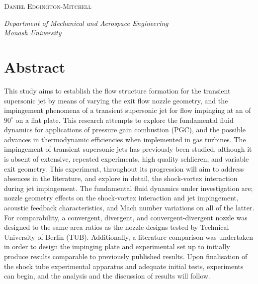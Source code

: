 \begin{titlepage}
	\vspace{0.5\baselineskip} %
	
	{\scshape\Large Daniel Edgington-Mitchell} %
	
	\vspace{2\baselineskip} %
	
	\textit{Department of Mechanical and Aerospace Engineering \\ Monash University} %
	
	\vfill %
	
	


\end{titlepage}
\section*{Abstract}
This study aims to establish the flow structure formation for the transient supersonic jet by means of varying the exit flow nozzle geometry, and the impingement phenomena of a transient supersonic jet for flow impinging at an of $90^{\circ}$ on a flat plate. This research attempts to explore the fundamental fluid dynamics for applications of pressure gain combustion (PGC), and the possible advances in thermodynamic efficiencies when implemented in gas turbines. The impingement of transient supersonic jets has previously been studied, although it is absent of extensive, repeated experiments, high quality schlieren, and variable exit geometry. This experiment, throughout its progression will aim to address absences in the literature, and explore in detail, the shock-vortex interaction during jet impingement. The fundamental fluid dynamics under investigation are; nozzle geometry effects on the shock-vortex interaction and jet impingement, acoustic feedback characteristics, and Mach number variations on all of the latter. For comparability, a convergent, divergent, and convergent-divergent nozzle was designed to the same area ratios as the nozzle designs tested by Technical University of Berlin (TUB). Additionally, a literature comparison was undertaken in order to design the impinging plate and experimental set up to initially produce results comparable to previously published results. Upon finalisation of the shock tube experimental apparatus and adequate initial tests, experiments can begin, and the analysis and the discussion of results will follow.

